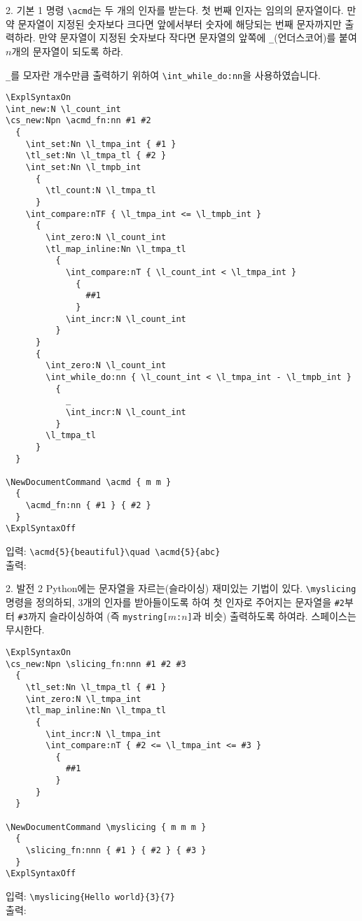 \documentclass[a4paper,amsmath,itemph]{oblivoir}
\begin{document}
\begin{questionp}{2. 기본 1}
  명령 \verb|\acmd|는 두 개의 인자를 받는다.
  첫 번째 인자는 임의의 문자열이다.
  만약 문자열이 지정된 숫자보다 크다면 앞에서부터 숫자에 해당되는 번째
  문자까지만 출력하라.
  만약 문자열이 지정된 숫자보다 작다면 문자열의 앞쪽에 \verb|_|(언더스코어)를
  붙여 $n$개의 문자열이 되도록 하라.

  \tcblower

  \verb|_|를 모자란 개수만큼 출력하기 위하여 \verb|\int_while_do:nn|을
  사용하였습니다.

  \begin{verbatim}
\ExplSyntaxOn
\int_new:N \l_count_int
\cs_new:Npn \acmd_fn:nn #1 #2
  {
    \int_set:Nn \l_tmpa_int { #1 }
    \tl_set:Nn \l_tmpa_tl { #2 }
    \int_set:Nn \l_tmpb_int
      {
        \tl_count:N \l_tmpa_tl
      }
    \int_compare:nTF { \l_tmpa_int <= \l_tmpb_int }
      {
        \int_zero:N \l_count_int
        \tl_map_inline:Nn \l_tmpa_tl
          {
            \int_compare:nT { \l_count_int < \l_tmpa_int }
              {
                ##1
              }
            \int_incr:N \l_count_int
          }
      }
      {
        \int_zero:N \l_count_int
        \int_while_do:nn { \l_count_int < \l_tmpa_int - \l_tmpb_int }
          {
            _
            \int_incr:N \l_count_int
          }
        \l_tmpa_tl
      }
  }

\NewDocumentCommand \acmd { m m }
  {
    \acmd_fn:nn { #1 } { #2 }
  }
\ExplSyntaxOff
  \end{verbatim}

  \begin{tcolorbox}{}
    입력: \verb|\acmd{5}{beautiful}\quad \acmd{5}{abc}|\\
    출력: \quad {}
  \end{tcolorbox}
\end{questionp}


\begin{questionp}{2. 발전 2}
  Python에는 문자열을 자르는(슬라이싱) 재미있는 기법이 있다.
  \verb|\myslicing| 명령을 정의하되, 3개의 인자를 받아들이도록 하여 첫 인자로
  주어지는 문자열을 \verb|#2|부터 \verb|#3|까지 슬라이싱하여 (즉
  \texttt{mystring[$m$:$n$]}과 비슷) 출력하도록 하여라.
  스페이스는 무시한다.

  \tcblower

  \begin{verbatim}
\ExplSyntaxOn
\cs_new:Npn \slicing_fn:nnn #1 #2 #3
  {
    \tl_set:Nn \l_tmpa_tl { #1 }
    \int_zero:N \l_tmpa_int
    \tl_map_inline:Nn \l_tmpa_tl
      {
        \int_incr:N \l_tmpa_int
        \int_compare:nT { #2 <= \l_tmpa_int <= #3 }
          {
            ##1
          }
      }
  }

\NewDocumentCommand \myslicing { m m m }
  {
    \slicing_fn:nnn { #1 } { #2 } { #3 }
  }
\ExplSyntaxOff
  \end{verbatim}

  \begin{tcolorbox}{}
    입력: \verb|\myslicing{Hello world}{3}{7}|\\
    출력: 
  \end{tcolorbox}
\end{questionp}
\end{document}
